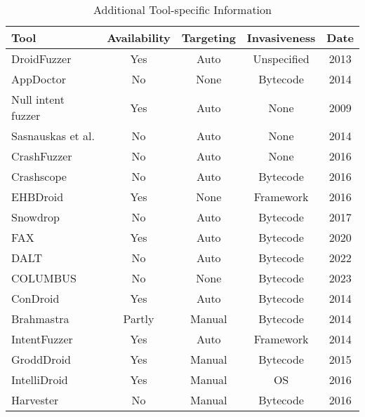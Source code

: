 \documentclass[preview, convert]{standalone}
\begin{document}
\newpage
\begin{table*}[!ht]
    \setlength{\tabcolsep}{1.5}
    \centering
    \caption{Additional Tool-specific Information}
    \begin{tabular}{|C{2.8cm}||c|c|c|c|}
    \hline
        Tool                & Availability  & Targeting     & Invasiveness  & Date \\ \hline
        DroidFuzzer         & Yes           & Auto          & Unspecified   & 2013 \\ \hline
        AppDoctor           & No            & None          & Bytecode      & 2014 \\ \hline
        Null intent fuzzer  & Yes           & Auto          & None          & 2009 \\ \hline
        Sasnauskas et al.   & No            & Auto          & None          & 2014 \\ \hline
        CrashFuzzer         & No            & Auto          & None          & 2016 \\ \hline
        Crashscope          & No            & Auto          & Bytecode      & 2016 \\ \hline
        EHBDroid            & Yes           & None          & Framework     & 2016 \\ \hline
        Snowdrop            & No            & Auto          & Bytecode      & 2017 \\ \hline
        FAX                 & Yes           & Auto          & Bytecode      & 2020 \\ \hline
        DALT                & No            & Auto          & Bytecode      & 2022 \\ \hline
        COLUMBUS            & No            & None          & Bytecode      & 2023 \\ \hline
        ConDroid            & Yes           & Auto          & Bytecode      & 2014 \\ \hline
        Brahmastra          & Partly        & Manual        & Bytecode      & 2014 \\ \hline
        IntentFuzzer        & Yes           & Auto          & Framework     & 2014 \\ \hline
        GroddDroid          & Yes           & Manual        & Bytecode      & 2015 \\ \hline
        IntelliDroid        & Yes           & Manual        & OS            & 2016 \\ \hline
        Harvester           & No            & Manual        & Bytecode      & 2016 \\ \hline

\end{tabular}
\end{table*}
\end{document}
